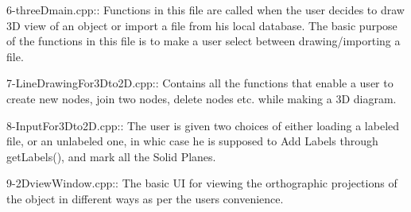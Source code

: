 6-\/three\+Dmain.\+cpp\+:\+: Functions in this file are called when the user decides to draw 3D view of an object or import a file from his local database. The basic purpose of the functions in this file is to make a user select between drawing/importing a file.

7-\/\+Line\+Drawing\+For3\+Dto2\+D.\+cpp\+:\+: Contains all the functions that enable a user to create new nodes, join two nodes, delete nodes etc. while making a 3D diagram.

8-\/\+Input\+For3\+Dto2\+D.\+cpp\+:\+: The user is given two choices of either loading a labeled file, or an unlabeled one, in whic case he is supposed to Add Labels through get\+Labels(), and mark all the Solid Planes.

9-\/2\+Dview\+Window.\+cpp\+:\+: The basic UI for viewing the orthographic projections of the object in different ways as per the user\textquotesingle{}s convenience. 